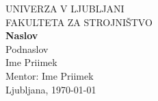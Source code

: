 \begin{titlepage}
\begin{center}
\large UNIVERZA V LJUBLJANI
\\[1cm]
\large FAKULTETA ZA STROJNIŠTVO
\\[6cm]
\Large\textbf{Naslov}
\\[0.5cm]
Podnaslov
\\[4cm]
Ime Priimek
\\[0.5cm]
Mentor: Ime Priimek
\\[5cm]
Ljubljana, \today
\end{center}
\end{titlepage}
